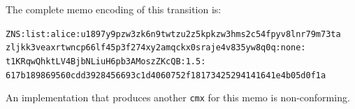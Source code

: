 The complete memo encoding of this transition is:

{\footnotesize
\begin{flushleft}
\texttt{ZNS:list:alice:u1897y9pzw3zk6n9twtzu2z5kpkzw3hms2c54fpyv8lnr79m73ta}\\
\texttt{zljkk3veaxrtwncp66lf45p3f274xy2amqckx0sraje4v835yw8q0q:none:}\\
\texttt{t1KRqwQhktLV4BjbNLiuH6pb3AMoszZKcQB:1.5:}\\
\texttt{617b189869560cdd3928456693c1d4060752f18173425294141641e4b05d0f1a}
\end{flushleft}
}

An implementation that produces another \texttt{cmx} for this memo is non-conforming.
